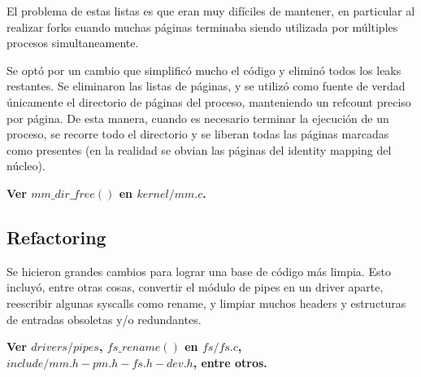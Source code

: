 El problema de estas listas es que eran muy difíciles de mantener, en particular
al realizar forks cuando muchas páginas terminaba siendo utilizada por múltiples
procesos simultaneamente.

Se optó por un cambio que simplificó mucho el código y eliminó todos los leaks
restantes. Se eliminaron las listas de páginas, y se utilizó como fuente de
verdad únicamente el directorio de páginas del proceso, manteniendo un refcount
preciso por página. De esta manera, cuando es necesario terminar la ejecución de
un proceso, se recorre todo el directorio y se liberan todas las páginas marcadas
como presentes (en la realidad se obvian las páginas del identity mapping del
núcleo).

\textbf{Ver $mm\_dir\_free()$ en $kernel/mm.c$.}

\subsection{Refactoring}

Se hicieron grandes cambios para lograr una base de código más limpia. Esto
incluyó, entre otras cosas, convertir el módulo de pipes en un driver aparte,
reescribir algunas syscalls como rename, y limpiar muchos headers y
estructuras de entradas obsoletas y/o redundantes.

\textbf{Ver $drivers/pipes$, $fs\_rename()$ en $fs/fs.c$,
    $include/mm.h-pm.h-fs.h-dev.h$, entre otros.}
